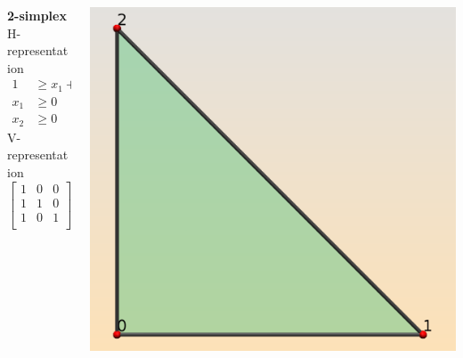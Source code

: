 \begin{frame}
\begin{columns}[t]
\begin{column}{0.5\textwidth}
\begin{block}{\textbf{2-simplex}}
H-representation
\begin{equation*}
\begin{aligned}\label{eq:simplex2H}
1 &\geq x_1 + x_2\\ 
x_1 &\geq 0\\
x_2 &\geq 0
\end{aligned}
\end{equation*}
V-representation
$$
\begin{bmatrix}
  1 & 0 & 0\\
  1 & 1 & 0\\
  1 & 0 & 1\\
\end{bmatrix}
$$
\end{block}
\end{column}
\begin{column}{0.5\textwidth}
\begin{center}
\includegraphics[width=1.0\textwidth]{fig/simplex2.png}
\end{center}
\end{column}
\end{columns}
\end{frame}
